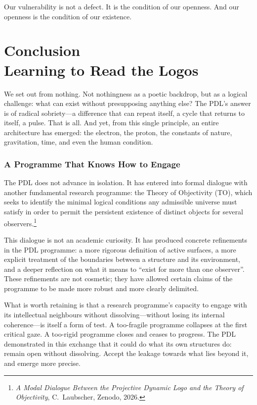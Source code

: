 \documentclass[12pt, a4paper, openright]{book}
\begin{document}
\medskip

Our vulnerability is not a defect. It is the condition of our openness. And our openness is the condition of our existence. 

\chapter[Conclusion --- Learning to Read the Logos]{Conclusion \\ Learning to Read the Logos}

We set out from nothing. Not nothingness as a poetic backdrop, but as a logical challenge: what can exist without presupposing anything else? The PDL's answer is of radical sobriety---a difference that can repeat itself, a cycle that returns to itself, a pulse. That is all. And yet, from this single principle, an entire architecture has emerged: the electron, the proton, the constants of nature, gravitation, time, and even the human condition.

\subsection*{A Programme That Knows How to Engage}

The PDL does not advance in isolation. It has entered into formal dialogue with another fundamental research programme: the Theory of Objectivity (TO), which seeks to identify the minimal logical conditions any admissible universe must satisfy in order to permit the persistent existence of distinct objects for several observers.\footnote{\textit{A Modal Dialogue Between the Projective Dynamic Logo and the Theory of Objectivity}, C.~Laubscher, Zenodo, 2026.}

\medskip

This dialogue is not an academic curiosity. It has produced concrete refinements in the PDL programme: a more rigorous definition of active surfaces, a more explicit treatment of the boundaries between a structure and its environment, and a deeper reflection on what it means to ``exist for more than one observer''. These refinements are not cosmetic; they have allowed certain claims of the programme to be made more robust and more clearly delimited.

\medskip

What is worth retaining is that a research programme's capacity to engage with its intellectual neighbours without dissolving---without losing its internal coherence---is itself a form of test. A too-fragile programme collapses at the first critical gaze. A too-rigid programme closes and ceases to progress. The PDL demonstrated in this exchange that it could do what its own structures do: remain open without dissolving. Accept the leakage towards what lies beyond it, and emerge more precise.
\end{document}
